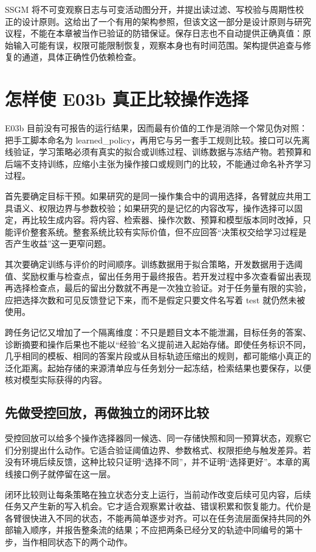 SSGM 将不可变观察日志与可变活动图分开，并提出读过滤、写校验与周期性校正的设计原则\cite{ssgm-2603}。这给出了一个有用的架构参照，但该文这一部分是设计原则与研究议程，不能在本章被当作已验证的防错保证。保存日志也不自动提供正确真值：原始输入可能有误，权限可能限制恢复，观察本身也有时间范围。架构提供追查与修复的通道，具体正确性仍依赖检查。

\section{怎样使 E03b 真正比较操作选择}
\label{sec:ch06-e03b-design}

E03b 目前没有可报告的运行结果，因而最有价值的工作是消除一个常见伪对照：把手工脚本命名为 learned\_policy，再用它与另一套手工规则比较。接口可以先离线验证，学习策略必须有真实的拟合或训练过程、训练数据与冻结产物。若预算和后端不支持训练，应缩小主张为操作接口或规则门的比较，不能通过命名补齐学习过程。

首先要确定目标干预。如果研究的是同一操作集合中的调用选择，各臂就应共用工具语义、权限边界与参数校验；如果研究的是记忆的内容改写，操作选择可以固定，再比较生成内容。将内容、检索器、操作次数、预算和模型版本同时改掉，只能评价整套系统。整套系统比较有实际价值，但不应回答“决策权交给学习过程是否产生收益”这一更窄问题。

其次要确定训练与评价的时间顺序。训练数据用于拟合策略，开发数据用于选阈值、奖励权重与检查点，留出任务用于最终报告。若开发过程中多次查看留出表现再选择检查点，最后的留出分数就不再是一次独立验证。对于任务量有限的实验，应把选择次数和可见反馈登记下来，而不是假定只要文件名写着 test 就仍然未被使用。

跨任务记忆又增加了一个隔离维度：不只是题目文本不能泄漏，目标任务的答案、诊断摘要和操作后果也不能以“经验”名义提前进入起始存储。即使任务标识不同，几乎相同的模板、相同的答案片段或从目标轨迹压缩出的规则，都可能缩小真正的泛化距离。起始存储的来源清单应与任务划分一起冻结，检索结果也要保存，以便核对模型实际获得的内容。

\subsection{先做受控回放，再做独立的闭环比较}

受控回放可以给多个操作选择器同一候选、同一存储快照和同一预算状态，观察它们分别提出什么动作。它适合验证阈值边界、参数格式、权限拒绝与触发差异。若没有环境后续反馈，这种比较只证明“选择不同”，并不证明“选择更好”。本章的离线接口例子就停留在这一层。

闭环比较则让每条策略在独立状态分支上运行，当前动作改变后续可见内容，后续任务又产生新的写入机会。它才适合观察累计收益、错误积累和恢复能力。代价是各臂很快进入不同的状态，不能再简单逐步对齐。可以在任务流层面保持共同的外部输入顺序，并报告整条流的结果；不应把两条已经分叉的轨迹中同编号的第十步，当作相同状态下的两个动作。

